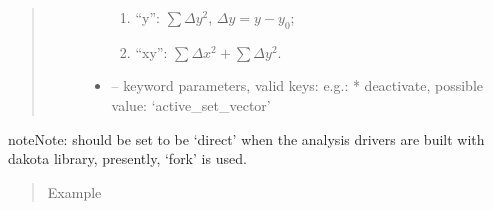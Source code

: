 \documentclass[letterpaper,10pt,english]{sphinxmanual}
\begin{document}
\begin{fulllineitems}
\begin{quote}
\begin{description}
\begin{itemize}
\begin{enumerate}
\item {} 
``y'': \(\sum \Delta y^2\), \(\Delta y = y-y_0\);

\item {} 
``xy'': \(\sum \Delta x^2 + \sum \Delta y^2\).

\end{enumerate}


\item {} 
 -- keyword parameters, valid keys: 
e.g.:
* deactivate, possible value: `active\_set\_vector'

\end{itemize}

\end{description}\end{quote}

\begin{sphinxadmonition}{note}{Note:}
 should be set to be `direct' when the analysis drivers are
built with dakota library, presently, `fork' is used.
\end{sphinxadmonition}
\begin{quote}\begin{description}
\item[{Example}] \leavevmode
\end{description}\end{quote}


\end{fulllineitems}
\end{document}
